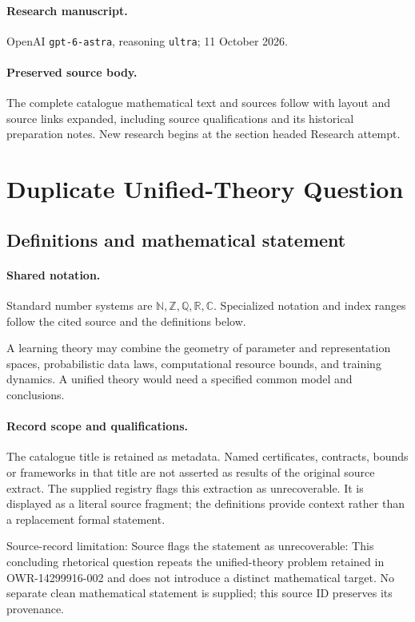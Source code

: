 \documentclass[11pt]{article}
\begin{document}
\paragraph{Research manuscript.} OpenAI \texttt{gpt-6-astra}, reasoning \texttt{ultra}; 11 October 2026.
\paragraph{Preserved source body.} The complete catalogue mathematical text and sources follow with layout and source links expanded, including source qualifications and its historical preparation notes. New research begins at the section headed Research attempt.

\section{Duplicate Unified-Theory Question}\label{statement}

\subsection{Definitions and mathematical statement}

\paragraph{Shared notation.}Standard number systems are $\mathbb N,\mathbb Z,\mathbb Q,\mathbb R,\mathbb C$. Specialized notation and index ranges follow the cited source and the definitions below.


A learning theory may combine the geometry of parameter and representation spaces, probabilistic data laws, computational resource bounds, and training dynamics. A unified theory would need a specified common model and conclusions.
\paragraph{Record scope and qualifications.}
The catalogue title is retained as metadata. Named certificates, contracts, bounds or frameworks in that title are not asserted as results of the original source extract.
The supplied registry flags this extraction as unrecoverable. It is displayed as a literal source fragment; the definitions provide context rather than a replacement formal statement.

Source-record limitation: Source flags the statement as unrecoverable: This concluding rhetorical question repeats the unified-theory problem retained in OWR-14299916-002 and does not introduce a distinct mathematical target. No separate clean mathematical statement is supplied; this source ID preserves its provenance.
\end{document}
